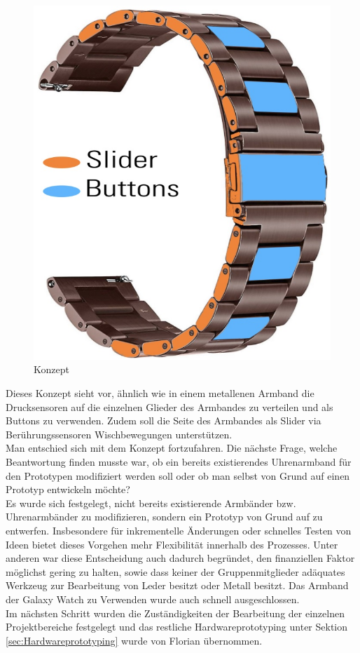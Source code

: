 \documentclass[12pt, a4paper]{article}
\begin{document}
\begin{figure}[h]
	\centering
	\includegraphics[scale=.35]{assets/Strap_initial_idea.jpg}
	\caption{Konzept }
	\label{fig:Initial_Idea}
\end{figure}

Dieses Konzept sieht vor, ähnlich wie in einem metallenen Armband die Drucksensoren auf die einzelnen Glieder des Armbandes zu verteilen und als Buttons zu verwenden. Zudem soll die Seite des Armbandes als Slider via Berührungssensoren Wischbewegungen unterstützen.\\	
Man entschied sich mit dem Konzept fortzufahren. Die nächste Frage, welche Beantwortung finden musste war, ob ein bereits existierendes Uhrenarmband für den Prototypen modifiziert werden soll oder ob man selbst von Grund auf einen Prototyp entwickeln möchte?\\
Es wurde sich festgelegt, nicht bereits existierende Armbänder bzw. Uhrenarmbänder zu modifizieren, sondern ein Prototyp von Grund auf zu entwerfen. Insbesondere für inkrementelle Änderungen oder schnelles Testen von Ideen bietet dieses Vorgehen mehr Flexibilität innerhalb des Prozesses. Unter anderen war diese Entscheidung auch dadurch begründet, den finanziellen Faktor möglichst gering zu halten, sowie dass keiner der Gruppenmitglieder adäquates Werkzeug zur Bearbeitung von Leder besitzt oder Metall besitzt. Das Armband der Galaxy Watch zu Verwenden wurde auch schnell ausgeschlossen.\\
Im nächsten Schritt wurden die Zuständigkeiten der Bearbeitung der einzelnen Projektbereiche festgelegt und das restliche Hardwareprototyping unter Sektion \ref{sec:Hardwareprototyping} wurde von Florian übernommen.\\
\end{document}

